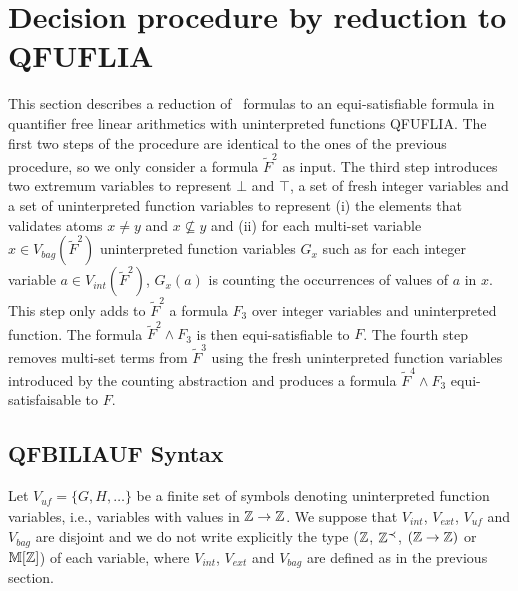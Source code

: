 
\section{Decision procedure by reduction to \textsf{QFUFLIA}}
\label{sec:forder}

This section describes a reduction of \QFBILIA\ formulas to an equi-satisfiable formula in quantifier free linear arithmetics with uninterpreted functions QFUFLIA.
The first two steps of the procedure are identical to the ones of the previous procedure, so we only consider a formula $\tilde{F}^2$ as input.
The third step introduces two extremum variables to represent $\bot$ and $\top$, a set of fresh integer variables and a set of uninterpreted function variables to represent
(i) the elements that validates atoms $x\neq y$ and $x\nsubseteq y$ and
(ii) for each multi-set variable $x\in V_{bag}(\tilde{F}^2)$ uninterpreted function variables
$G_{x}$ such as for each integer variable $a\in V_{int}(\tilde{F}^2)$, $G_{x}(a)$ is counting the occurrences of values of $a$ in $x$.
This step only adds to $\tilde{F}^2$ a formula $F_3$ over integer variables and uninterpreted function. The formula $\tilde{F}^2 \land F_3$ is then equi-satisfiable to $F$.
The fourth step removes multi-set terms from $\tilde{F}^3$ using the fresh uninterpreted function variables introduced by the counting abstraction and produces a formula $\tilde{F}^4 \land F_3$ equi-satisfaisable to $F$.


\subsection{QFBILIAUF Syntax}
\label{ssec:synUF}

Let $V_{\textit{uf}}=\{G,H,\ldots\}$ be a finite set of symbols denoting uninterpreted function variables, i.e., variables with values in $\mathbb{Z} \rightarrow \mathbb{Z}$.
We suppose that $V_{int}$, $V_{ext}$, $V_{\textit{uf}}$ and $V_{bag}$ are disjoint and we do not write explicitly the type ($\mathbb{Z}$, $\mathbb{Z}^{\prec}$, $(\mathbb{Z} \rightarrow \mathbb{Z})$ or $\mathbb{M}[\mathbb{Z}]$) of each variable,
where $V_{int}$, $V_{ext}$ and $V_{bag}$ are defined as in the previous section.

